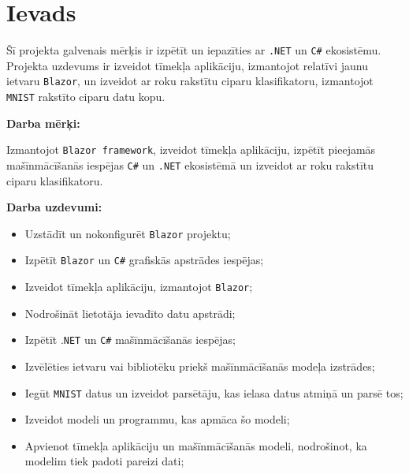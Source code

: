 \section{Ievads}

    Šī projekta galvenais mērķis ir izpētīt un iepazīties
    ar \texttt{.NET} un \texttt{C\#} ekosistēmu. Projekta uzdevums ir izveidot tīmekļa aplikāciju, izmantojot relatīvi
    jaunu ietvaru \texttt{Blazor}, un izveidot ar roku rakstītu ciparu klasifikatoru, izmantojot
    \texttt{MNIST} rakstīto ciparu datu kopu.


    \textbf{Darba mērķi:}

    Izmantojot \texttt{Blazor framework}, izveidot tīmekļa aplikāciju, izpētīt pieejamās mašīnmācīšanās
    iespējas \texttt{C\#} un \texttt{.NET} ekosistēmā un izveidot ar roku rakstītu ciparu klasifikatoru.

    \textbf{Darba uzdevumi:}

    \begin{itemize}
        \item Uzstādīt un nokonfigurēt \texttt{Blazor} projektu;
        \item Izpētīt \texttt{Blazor} un \texttt{C\#} grafiskās apstrādes iespējas;
        \item Izveidot tīmekļa aplikāciju, izmantojot \texttt{Blazor};
        \item Nodrošināt lietotāja ievadīto datu apstrādi;
        \item Izpētīt .\texttt{NET} un \texttt{C\#} mašīnmācīšanās iespējas;
        \item Izvēlēties ietvaru vai bibliotēku priekš mašīnmācīšanās modeļa izstrādes;
        \item Iegūt \texttt{MNIST} datus un izveidot parsētāju, kas ielasa datus atmiņā un parsē tos;
        \item Izveidot modeli un programmu, kas apmāca šo modeli;
        \item Apvienot tīmekļa aplikāciju un mašīnmācīšanās modeli, nodrošinot, ka modelim tiek padoti pareizi dati;
    \end{itemize}

